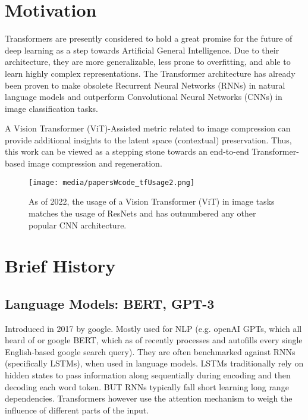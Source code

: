 
\section{Motivation}

Transformers are presently considered to hold a great promise for the future of deep learning
as a step towards Artificial General Intelligence.
Due to their architecture, they are more generalizable, less prone to overfitting, and able 
to learn highly complex representations. The Transformer architecture has already been proven 
to make obsolete Recurrent Neural Networks (RNNs) in natural language models and outperform
Convolutional Neural Networks (CNNs) in image classification tasks.

A Vision Transformer (ViT)-Assisted metric related to image compression can provide 
additional insights to the latent space (contextual) preservation.
Thus, this work can be viewed as a stepping stone towards an end-to-end Transformer-based
image compression and regeneration.


\begin{figure}[H]
	\begin{center}
	\texttt{[image: media/papersWcode\_tfUsage2.png]}
	\end{center}
	\caption[Historical Usage of ViT in Image Tasks]{As of 2022, the usage of a Vision Transformer (ViT) in image 
	tasks matches the usage of ResNets and has outnumbered any other popular CNN architecture.
	\citep{PapersOverTime}}
	\end{figure}


\section{Brief History}

\subsection{Language Models: BERT, GPT-3}

Introduced in 2017 by google. Mostly used for NLP (e.g. openAI GPTs, 
which all heard of or google BERT, which as of recently processes 
and autofills every single English-based google search query). 
They are often benchmarked against RNNs (specifically LSTMs), when used in 
language models. LSTMs traditionally rely on hidden states to pass information 
along sequentially during encoding and then decoding each word token. BUT RNNs 
typically fall short learning long range dependencies.
Transformers however use the attention mechanism to weigh the influence of 
different parts of the input.

